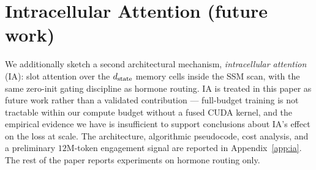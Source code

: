 \section{Intracellular Attention (future work)}
\label{sec:intracellular}

We additionally sketch a second architectural mechanism, \emph{intracellular attention} (IA): slot attention over the $d_{\text{state}}$ memory cells inside the SSM scan, with the same zero-init gating discipline as hormone routing. IA is treated in this paper as future work rather than a validated contribution --- full-budget training is not tractable within our compute budget without a fused CUDA kernel, and the empirical evidence we have is insufficient to support conclusions about IA's effect on the loss at scale. The architecture, algorithmic pseudocode, cost analysis, and a preliminary $12$M-token engagement signal are reported in Appendix~\ref{app:ia}. The rest of the paper reports experiments on hormone routing only.
